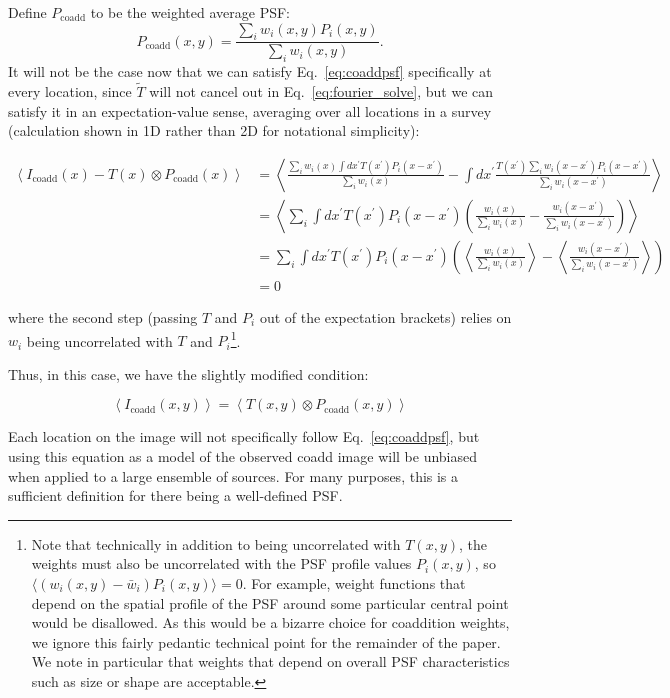 \documentclass{aastex63}
\newcommand{\irresponse}[1]{{#1}}
\begin{document}
\begin{itemize}
    Define $P_\text{coadd}$ to be the weighted average PSF:
    \begin{equation}\label{eq:varweightpsf}
        P_\text{coadd}(x,y) = \frac{\sum_i w_i(x,y) P_i(x,y)}{\sum_i w_i(x,y)}.
    \end{equation}
    It will not be the case now that we can satisfy Eq.~\eqref{eq:coaddpsf} specifically at every location, since $\widetilde{T}$ will not cancel out in Eq.~\eqref{eq:fourier_solve}, but we can satisfy it in an expectation-value sense, averaging over all locations in a survey (calculation shown in 1D rather than 2D for notational simplicity):
    \begin{linenomath}\begin{align*}
      \left\langle I_\text{coadd}(x) - T(x) \otimes P_\text{coadd}(x) \right\rangle
      &= \left\langle \frac{
                  \sum_i w_i(x) \int dx^\prime  T(x^\prime) P_i(x-x^\prime)  }{\sum_i w_i(x)} 
                  - \int\! dx^\prime  \frac{T(x^\prime) \sum_i w_i(x-x^\prime) P_i(x-x^\prime)}{\sum_i w_i(x-x^\prime)} \right\rangle \\
      &= \left\langle
                  \sum_i \int\! dx^\prime  T(x^\prime) P_i(x-x^\prime) \left(\frac{w_i(x)}{\sum_i w_i(x)} - \frac{w_i(x-x^\prime)}{\sum_i w_i(x-x^\prime)}\right) \right\rangle \\
      &=
                  \sum_i \int\! dx^\prime  T(x^\prime) P_i(x-x^\prime)
                  \left( \left\langle \frac{w_i(x)}{\sum_i w_i(x)}\right\rangle - \left\langle\frac{w_i(x-x^\prime)}{\sum_i w_i(x-x^\prime)}\right\rangle \right)\\
      &= 0
    \end{align*}\end{linenomath}
    where the second step (passing $T$ and $P_i$ out of the expectation brackets) relies on $w_i$ being uncorrelated with $T$ and $P_i$\footnote{\irresponse{Note that technically in addition to being uncorrelated with $T(x,y)$, the weights must also be uncorrelated with the PSF profile values $P_i(x,y)$, so $\langle (w_i(x,y)-\bar w_i) P_i(x,y) \rangle = 0$. For example, weight functions that depend on the spatial profile of the PSF around some particular central point would be disallowed. As this would be a bizarre choice for coaddition weights, we ignore this fairly pedantic technical point for the remainder of the paper. We note in particular that weights that depend on overall PSF characteristics such as size or shape are acceptable.}}.
    
    Thus, in this case, we have the slightly modified condition:
    \begin{linenomath}\begin{equation}\label{eq:expcoaddpsf}
        \left\langle I_\text{coadd}(x,y) \right\rangle = \left\langle T(x,y) \otimes P_\text{coadd}(x,y) \right\rangle
    \end{equation}\end{linenomath}
    Each location on the image will not specifically follow Eq.~\eqref{eq:coaddpsf}, but using this equation as a model of the observed coadd image will be unbiased when applied to a large ensemble of sources.  For \irresponse{many} purposes, this is a sufficient definition for there being a well-defined PSF.


\end{itemize}
\end{document}
